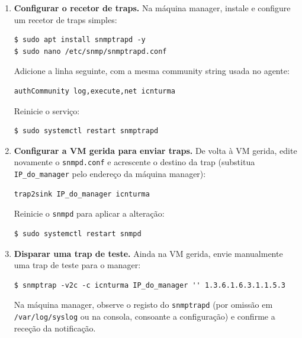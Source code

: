 \documentclass[11pt,a4paper]{article}
\begin{document}
\begin{enumerate}[label=\arabic*.]
  Compare agora com um valor do tipo \texttt{Gauge32}, que sobe e desce livremente.
  O OID \texttt{tcpCurrEstab} indica quantas ligações TCP estão estabelecidas neste momento:
\begin{lstlisting}
$ snmpget -v2c -c icnturma IP_da_VM 1.3.6.1.2.1.6.9.0
$ sleep 5
$ snmpget -v2c -c icnturma IP_da_VM 1.3.6.1.2.1.6.9.0
\end{lstlisting}
  Aqui o valor absoluto \emph{é} informativo, e pode diminuir entre leituras -- ao contrário do contador anterior.

  \item \textbf{Configurar o recetor de traps.} Na máquina manager, instale e configure um recetor de traps simples:
\begin{lstlisting}
$ sudo apt install snmptrapd -y
$ sudo nano /etc/snmp/snmptrapd.conf
\end{lstlisting}
  Adicione a linha seguinte, com a mesma community string usada no agente:
\begin{lstlisting}
authCommunity log,execute,net icnturma
\end{lstlisting}
  Reinicie o serviço:
\begin{lstlisting}
$ sudo systemctl restart snmptrapd
\end{lstlisting}

  \item \textbf{Configurar a VM gerida para enviar traps.} De volta à VM gerida, edite novamente o \texttt{snmpd.conf} e acrescente o destino da trap (substitua \texttt{IP\_do\_manager} pelo endereço da máquina manager):
\begin{lstlisting}
trap2sink IP_do_manager icnturma
\end{lstlisting}
  Reinicie o \texttt{snmpd} para aplicar a alteração:
\begin{lstlisting}
$ sudo systemctl restart snmpd
\end{lstlisting}

  \item \textbf{Disparar uma trap de teste.} Ainda na VM gerida, envie manualmente uma trap de teste para o manager:
\begin{lstlisting}
$ snmptrap -v2c -c icnturma IP_do_manager '' 1.3.6.1.6.3.1.1.5.3
\end{lstlisting}
  Na máquina manager, observe o registo do \texttt{snmptrapd} (por omissão em \texttt{/var/log/syslog} ou na consola, consoante a configuração) e confirme a receção da notificação.
\end{enumerate}
\end{document}
